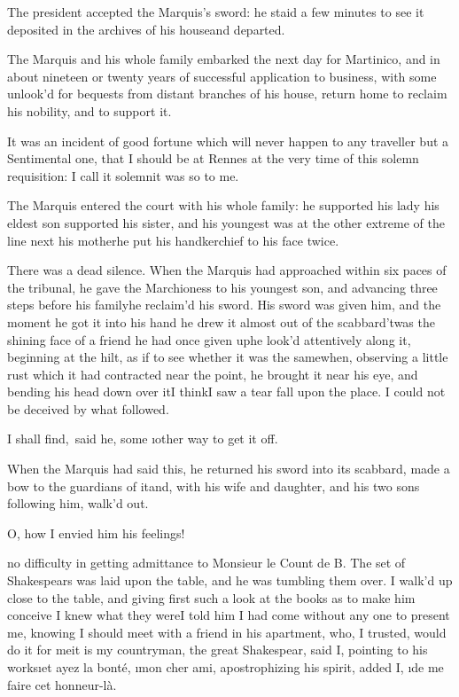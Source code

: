 \documentclass[twoside]{article}
\begin{document}
The president accepted the Marquis’s
sword: he staid a few minutes to see it
deposited in the archives of his
house\tskk and departed.

The Marquis and his whole family embarked
the next day for Martinico, and in about
nineteen or twenty years of successful
application to business, with some
unlook’d for bequests from distant
branches of his house, return home to
reclaim his nobility, and to support it.

It was an incident of good fortune which
will never happen to any traveller but a
Sentimental one, that I should be at
Rennes at the very time of this solemn
requisition: I call it solemn\tskk it was
so to me.

The Marquis entered the court with his
whole family: he supported his lady\tskk
his eldest son supported his sister, and
his youngest was at the other extreme of
the line next his mother\tskk he put his
handkerchief to his face twice.\tskk 

\tskk There was a dead silence.  When the
Marquis had approached within six paces of
the tribunal, he gave the Marchioness to
his youngest son, and advancing three
steps before his family\tskk he reclaim’d
his sword.  His sword was given him, and
the moment he got it into his hand he drew
it almost out of the scabbard\tskk ’twas
the shining face of a friend he had once
given up\tskk he look’d attentively along
it, beginning at the hilt, as if to see
whether it was the same\tskk when,
observing a little rust which it had
contracted near the point, he brought it
near his eye, and bending his head down
over it\tskk I think\tskk I saw a tear
fall upon the place.  I could not be
deceived by what followed.

\lqq I shall find,\rqq\ said he, \lqq some \i{other
way} to get it off.\rqq 

When the Marquis had said this, he
returned his sword into its scabbard, made
a bow to the guardians of it\tskk and,
with his wife and daughter, and his two
sons following him, walk’d out.

O, how I envied him his feelings!





\vskip 6pt


 no difficulty in
getting admittance to Monsieur le Count de
B\anon.  The set of Shakespears was laid
upon the table, and he was tumbling them
over.  I walk’d up close to the table, and
giving first such a look at the books as
to make him conceive I knew what they
were\tskk I told him I had come without
any one to present me, knowing I should
meet with a friend in his apartment, who,
I trusted, would do it for me\tskk it is
my countryman, the great Shakespear, said
I, pointing to his works\tskk \i{et ayez
la bonté}, \i{mon cher ami},
apostrophizing his spirit, added I, \i{de
me faire cet honneur-là}.\tskk 
\end{document}
